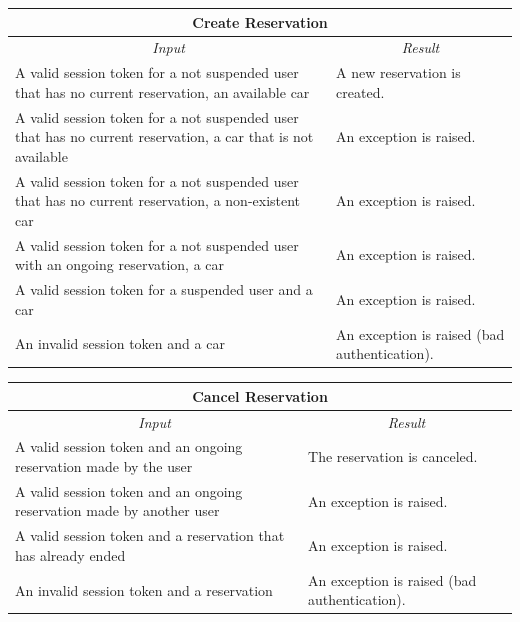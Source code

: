 \documentclass[english]{article}
\begin{document}
\begin{center}
	\begin{tabular}{ | p{6cm} | p{6cm} | }
		\hline 
		\multicolumn{2}{|c|}{\textbf{Create Reservation}} \\
		\hline
		\multicolumn{1}{|c|}{\textit{Input}} & \multicolumn{1}{c|}{\textit{Result}} \\
		\hline
		A valid session token for a not suspended user that has no current reservation, an available car & A new reservation is created. \\
		\hline
		A valid session token for a not suspended user that has no current reservation, a car that is not available & An exception is raised. \\
		\hline
		A valid session token for a not suspended user that has no current reservation, a non-existent car & An exception is raised. \\
		\hline
		A valid session token for a not suspended user with an ongoing reservation, a car & An exception is raised. \\
		\hline
		A valid session token for a suspended user and a car & An exception is raised. \\
		\hline
		An invalid session token and a car & An exception is raised (bad authentication). \\
		\hline
	\end{tabular}
\end{center}

\begin{center}
	\begin{tabular}{ | p{6cm} | p{6cm} | }
		\hline 
		\multicolumn{2}{|c|}{\textbf{Cancel Reservation}} \\
		\hline
		\multicolumn{1}{|c|}{\textit{Input}} & \multicolumn{1}{c|}{\textit{Result}} \\
		\hline
		A valid session token and an ongoing reservation made by the user & The reservation is canceled. \\
		\hline
		A valid session token and an ongoing reservation made by another user & An exception is raised. \\
		\hline
		A valid session token and a reservation that has already ended & An exception is raised. \\
		\hline
		An invalid session token and a reservation & An exception is raised (bad authentication). \\
		\hline
	\end{tabular}
\end{center}
\end{document}
